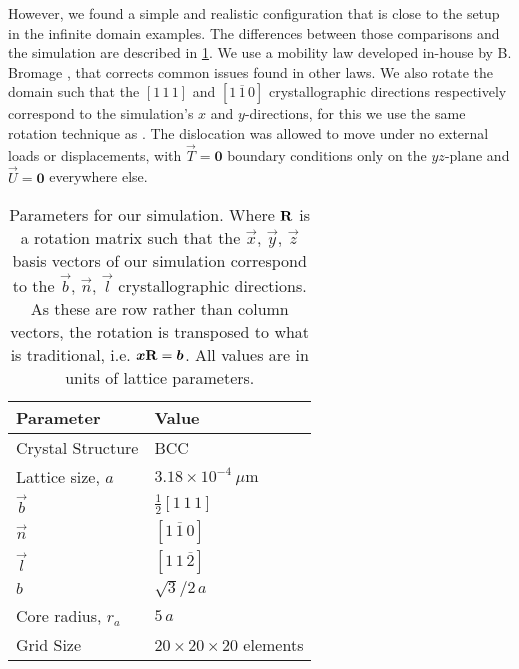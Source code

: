 However, we found a simple and realistic configuration that is close to the setup in the infinite domain examples. The differences between those comparisons and the simulation are described in \cref{t:simulation_params}. We use a mobility law developed in-house by B. Bromage \cite{bromage2018calculating}, that corrects common issues found in other laws. We also rotate the domain such that the $[1\, 1\, 1]$ and $[1\, \overline{1}\, 0]$ crystallographic directions respectively correspond to the simulation's $x$ and $y$-directions, for this we use the same rotation technique as \cite{YU2018,yu2020simulating,yu2019influence}. The dislocation was allowed to move under no external loads or displacements, with $\vec{T} = \bm{0}$ boundary conditions only on the $yz$-plane and $\vec{U} = \bm{0}$ everywhere else.
\begin{table}
  \centering
  \caption[Numeric v.s. analytic tractions. Unloaded simulation comparison.]{Parameters for our simulation. Where $\mathbf{R}$ is a rotation matrix such that the $\vec{x},\, \vec{y},\, \vec{z}$ basis vectors of our simulation correspond to the $\vec{b},\, \vec{n},\, \vec{l}$ crystallographic directions. As these are row rather than column vectors, the rotation is transposed to what is traditional, i.e. $\vec{x}\mtx{R} = \vec{b}$. All values are in units of lattice parameters.}
  \label{t:simulation_params}
  \begin{tabular}{ll}
    \toprule
    Parameter                & Value                                                     \\
    \midrule
    Crystal Structure        & BCC                                                       \\
    Lattice size, $a$        & $3.18\times 10^{-4}~\mu\text{m}$                          \\
    $\vec{b}$                & $\frac{1}{2}[1\, 1\, 1]$                                  \\
    $\vec{n}$                & $[1\, \overline{1}\, 0]$                                  \\
    $\vec{l}$                & $[1\, 1\, \overline{2}]$                                  \\
    $b$                      & $\sqrt{3}/2\, a$                                          \\
    Core radius, $r_a$       & $5\, a$                                                   \\
    Grid Size                & $20 \times 20 \times 20$ elements                         \\

\end{tabular}
\end{table}
